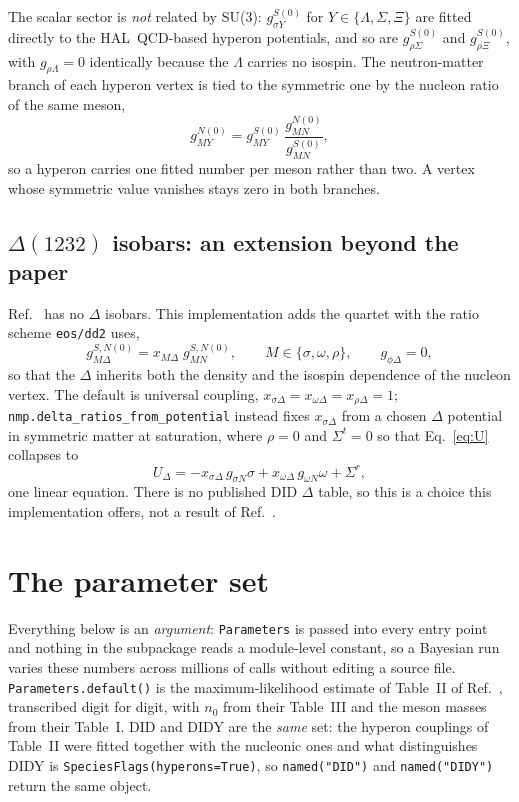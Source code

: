 \documentclass[aps,prc,onecolumn,superscriptaddress,nofootinbib,10pt]{revtex4-2}
\newcommand{\nzero}{n_0}
\newcommand{\Sigmar}{\Sigma^{r}}
\newcommand{\Sigmat}{\Sigma^{t}}
\begin{document}
The scalar sector is \emph{not} related by SU(3): $g^{S(0)}_{\sigma Y}$ for
$Y \in \{\Lambda, \Sigma, \Xi\}$ are fitted directly to the HAL~QCD-based
hyperon potentials, and so are $g^{S(0)}_{\rho\Sigma}$ and
$g^{S(0)}_{\rho\Xi}$, with $g_{\rho\Lambda} = 0$ identically because the
$\Lambda$ carries no isospin. The neutron-matter branch of each hyperon vertex
is tied to the symmetric one by the nucleon ratio of the same meson,
\begin{equation}
  g^{N(0)}_{M Y} = g^{S(0)}_{M Y}\,
                   \frac{g^{N(0)}_{M N}}{g^{S(0)}_{M N}} ,
  \label{eq:branchtie}
\end{equation}
so a hyperon carries one fitted number per meson rather than two. A vertex
whose symmetric value vanishes stays zero in both branches.

\subsection{$\Delta(1232)$ isobars: an extension beyond the paper}
\label{sec:deltas}

Ref.~\cite{Frohaug2025} has no $\Delta$ isobars. This implementation adds the
quartet with the ratio scheme \texttt{eos/dd2} uses,
\begin{equation}
  g^{S,N(0)}_{M\Delta} = x_{M\Delta}\; g^{S,N(0)}_{M N} ,
  \qquad M \in \{\sigma, \omega, \rho\}, \qquad g_{\phi\Delta} = 0 ,
\end{equation}
so that the $\Delta$ inherits both the density and the isospin dependence of
the nucleon vertex. The default is universal coupling,
$x_{\sigma\Delta} = x_{\omega\Delta} = x_{\rho\Delta} = 1$;
\texttt{nmp.delta\_ratios\_from\_potential} instead fixes $x_{\sigma\Delta}$
from a chosen $\Delta$ potential in symmetric matter at saturation, where
$\rho = 0$ and $\Sigmat = 0$ so that Eq.~\eqref{eq:U} collapses to
\begin{equation}
  U_\Delta = -x_{\sigma\Delta}\, g_{\sigma N}\sigma
             + x_{\omega\Delta}\, g_{\omega N}\omega + \Sigmar ,
\end{equation}
one linear equation. There is no published DID $\Delta$ table, so this is a
choice this implementation offers, not a result of Ref.~\cite{Frohaug2025}.

\section{The parameter set}
\label{sec:parameters}

Everything below is an \emph{argument}: \texttt{Parameters} is passed into every
entry point and nothing in the subpackage reads a module-level constant, so a
Bayesian run varies these numbers across millions of calls without editing a
source file. \texttt{Parameters.default()} is the maximum-likelihood estimate of
Table~II of Ref.~\cite{Frohaug2025}, transcribed digit for digit, with $\nzero$
from their Table~III and the meson masses from their Table~I. DID and DIDY are
the \emph{same} set: the hyperon couplings of Table~II were fitted together with
the nucleonic ones and what distinguishes DIDY is
\texttt{SpeciesFlags(hyperons=True)}, so \texttt{named("DID")} and
\texttt{named("DIDY")} return the same object.
\end{document}

